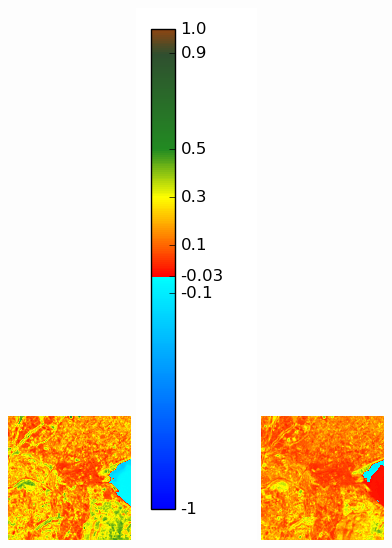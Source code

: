 \documentclass{book}
\begin{document}
\begin{figure}[H]
{\includegraphics[scale=0.7]{images/Annecy/09_ndvi.png}
\includegraphics[scale=0.2]{images/colormap.png}
\includegraphics[scale=0.7]{images/Annecy/10_ndvi.png}
}
\end{figure}
\end{document}
